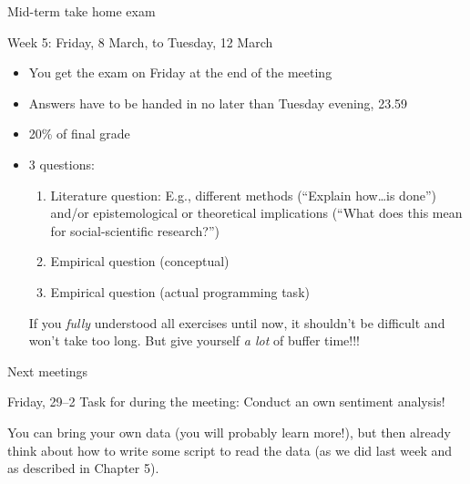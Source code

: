 \documentclass{beamer}
\begin{document}
\begin{frame}{Mid-term take home exam}
\begin{block}{Week 5: Friday, 8 March, to Tuesday, 12 March}
\begin{itemize}
\item You get the exam on Friday at the end of the meeting
\item Answers have to be handed in no later than Tuesday evening, 23.59
\item 20\% of final grade
\item 3 questions:
\begin{enumerate}
\item Literature question: E.g., different methods (``Explain how\ldots is done'') and/or epistemological or theoretical implications (``What does this mean for social-scientific research?'')
\item Empirical question (conceptual)
\item Empirical question (actual programming task)
\end{enumerate}
If you \emph{fully} understood all exercises until now, it shouldn't be difficult and won't take too long. But give yourself \emph{a lot} of buffer time!!! 
\end{itemize}
\end{block}
\end{frame}



\begin{frame}{Next meetings}
\begin{block}{Friday, 29--2}
Task for during the meeting: Conduct an own sentiment analysis!

You can bring your own data (you will probably learn more!), but then already think about how to write some script to read the data (as we did last week and as described in Chapter 5).
\end{block}

\end{frame}
\end{document}
